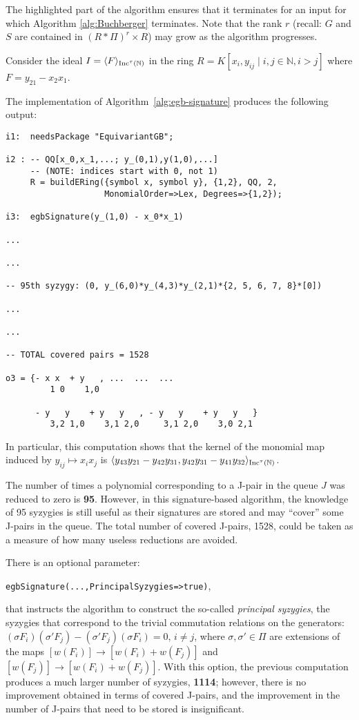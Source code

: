 The highlighted part of the algorithm ensures that it terminates for an input for which Algorithm \ref{alg:Buchberger} terminates.
Note that the rank $r$ (recall: $G$ and $S$ are contained in $(R*\Pi)^r\times R$) may grow as the algorithm progresses. 

\begin{example}
Consider the ideal $I = \langle F \rangle_{\operatorname{Inc}^\tau(\mathbb N)}$ in the ring $R=K[x_i, y_{ij}\mid i,j\in\mathbb N, i>j]$ where $F = y_{21}-x_2x_1$.

The implementation of Algorithm~\ref{alg:egb-signature} produces the following output:
\begin{M2}
\begin{verbatim}
i1:  needsPackage "EquivariantGB";

i2 : -- QQ[x_0,x_1,...; y_(0,1),y(1,0),...] 
     -- (NOTE: indices start with 0, not 1)
     R = buildERing({symbol x, symbol y}, {1,2}, QQ, 2, 
                    MonomialOrder=>Lex, Degrees=>{1,2});

i3:  egbSignature(y_(1,0) - x_0*x_1)

...

...

-- 95th syzygy: (0, y_(6,0)*y_(4,3)*y_(2,1)*{2, 5, 6, 7, 8}*[0])

...

...

-- TOTAL covered pairs = 1528
                     
o3 = {- x x  + y   , ...  ...  ...
         1 0    1,0  

      - y   y    + y   y   , - y   y    + y   y   }
         3,2 1,0    3,1 2,0     3,1 2,0    3,0 2,1
\end{verbatim}
\end{M2}  

In particular, this computation shows that the kernel of the monomial map induced by $y_{ij}\mapsto x_ix_j$ is 
$\langle y_{43}y_{21}-y_{42}y_{31},y_{42}y_{31}-y_{41}y_{32} \rangle_{\operatorname{Inc}^\tau(\mathbb N)}$.

The number of times a polynomial corresponding to a J-pair in the queue $J$ was reduced to zero is {\bf 95}. However, in this signature-based algorithm, the knowledge of 95 syzygies is still useful as their signatures are stored and may ``cover'' some J-pairs in the queue. The total number of covered J-pairs, 1528, could be taken as a measure of how many useless reductions are avoided.

There is an optional parameter: \begin{center} \verb|egbSignature(...,PrincipalSyzygies=>true)|,\end{center} that instructs the algorithm to construct the so-called \emph{principal syzygies}, the syzygies that correspond to the trivial commutation relations on the generators: $(\sigma F_i) (\sigma' F_j)-(\sigma'F_j)(\sigma F_i)=0$, $i\neq j$, where $\sigma,\sigma'\in\Pi$ are extensions of the maps $[w(F_i)] \to [w(F_i) + w(F_j)]$ and $ [w(F_j)] \to [w(F_i) + w(F_j)]$.
With this option, the previous computation produces a much larger number of syzygies, {\bf 1114}; however, there is no improvement obtained in terms of covered J-pairs, and the improvement in the number of J-pairs that need to be stored is insignificant. 


\end{example}
